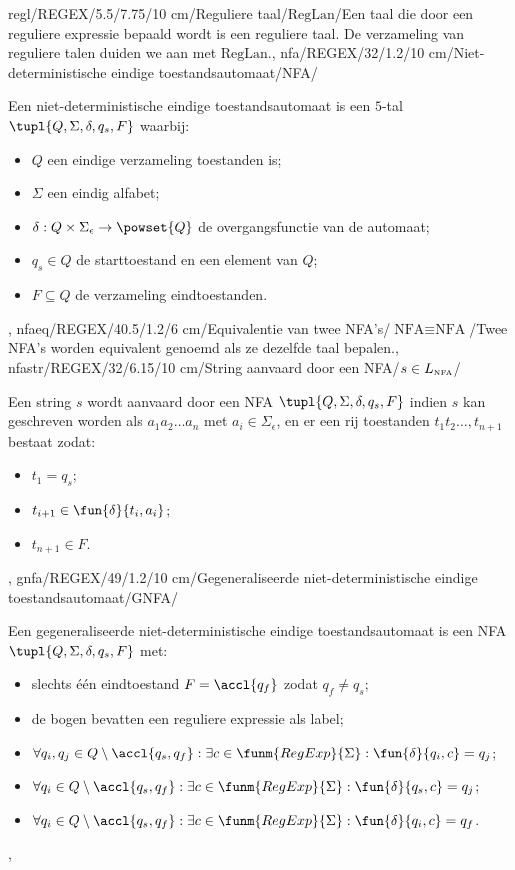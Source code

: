 regl/REGEX/5.5/7.75/10 cm/Reguliere taal/$\mbox{RegLan}$/{Een taal die door een reguliere expressie bepaald wordt is een reguliere taal. De verzameling van reguliere talen duiden we aan met $\mbox{RegLan}$.},
nfa/REGEX/32/1.2/10 cm/Niet-deterministische eindige toestandsautomaat/NFA/{Een niet-deterministische eindige toestandsautomaat is een $5$-tal $\tupl{Q,\Sigma,\delta,q_s,F}$ waarbij:\begin{itemize}
 \item $Q$ een eindige verzameling toestanden is;
 \item $\Sigma$ een eindig alfabet;
 \item $\delta:Q\times\Sigma_{\epsilon}\rightarrow\powset{Q}$ de overgangsfunctie van de automaat;
 \item $q_s\in Q$ de starttoestand en een element van $Q$;
 \item $F\subseteq Q$ de verzameling eindtoestanden.
\end{itemize}},
nfaeq/REGEX/40.5/1.2/6 cm/Equivalentie van twee NFA's/$\mbox{NFA}\equiv\mbox{NFA}$/{Twee NFA's worden equivalent genoemd als ze dezelfde taal bepalen.},
nfastr/REGEX/32/6.15/10 cm/String aanvaard door een NFA/$s\in L_{\mbox{\tiny NFA}}$/{Een string $s$ wordt aanvaard door een NFA $\tupl{Q,\Sigma,\delta,q_s,F}$ indien $s$ kan geschreven worden als $a_1a_2\ldots a_n$ met $a_i\in\Sigma_{\epsilon}$, en er een rij toestanden $t_1t_2\ldots,t_{n+1}$ bestaat zodat:\begin{itemize}
 \item $t_1=q_s$;
 \item $t_{i+1}\in\fun{\delta}{t_i,a_i}$;
 \item $t_{n+1}\in F$.
\end{itemize}},
gnfa/REGEX/49/1.2/10 cm/Gegeneraliseerde niet-deterministische eindige toestandsautomaat/GNFA/{Een gegeneraliseerde niet-deterministische eindige toestandsautomaat is een NFA $\tupl{Q,\Sigma,\delta,q_s,F}$ met:\begin{itemize}
 \item slechts \'e\'en eindtoestand $F=\accl{q_f}$ zodat $q_f\neq q_s$;
 \item de bogen bevatten een reguliere expressie als label;
 \item $\forall q_i,q_j\in Q\setminus\accl{q_s,q_f}:\exists c\in\funm{RegExp}{\Sigma}:\fun{\delta}{q_i,c}=q_j$;
 \item $\forall q_i\in Q\setminus\accl{q_s,q_f}:\exists c\in\funm{RegExp}{\Sigma}:\fun{\delta}{q_s,c}=q_j$;
 \item $\forall q_i\in Q\setminus\accl{q_s,q_f}:\exists c\in\funm{RegExp}{\Sigma}:\fun{\delta}{q_i,c}=q_f$.
\end{itemize}},
